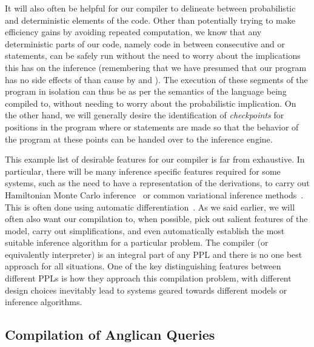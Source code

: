 It will also often be helpful for our compiler to delineate between probabilistic and deterministic
elements of the code.  Other than potentially trying to make efficiency gains by avoiding
repeated computation, we know that any deterministic parts of our code, namely code in between
consecutive \sample and or \observe statements, can be safely run without the need
to worry about the implications this has on the inference (remembering that we have presumed
that our program has no side effects of than cause by \sample and \observe).  The execution of these segments of
the program in isolation can thus be as per the semantics of the language being compiled to, without needing to
worry about the probabilistic implication.  On the other hand, we will generally desire the identification
of \emph{checkpoints} for positions in the program where \sample or \observe statements are
made so that the behavior of the program at these points can be handed over to the inference
engine.
%

This example list of desirable features for our compiler is far from exhaustive.
In particular, there will be many inference specific features required for some
systems, such as the need to have a representation of the derivations, to carry out 
Hamiltonian Monte Carlo inference~\citep{carpenter2015stan}
or common variational inference methods~\citep{kucukelbir2015automatic}.  
This is often done using automatic differentiation~\citep{baydin2015automatic}.
As we
said earlier, we will often also want our compilation to, when possible,
pick out salient features of the model, carry out simplifications, and even automatically 
establish the most suitable inference algorithm for a particular problem.  The compiler (or equivalently interpreter)
is an integral part of any PPL and there is no one best approach for all situations. 
One of the key distinguishing features between different PPLs is how they approach
this compilation problem, with different design choices inevitably lead to systems
geared towards different models or inference algorithms. 

\subsection{Compilation of Anglican Queries}
\label{sec:proginf:comp:ang}


